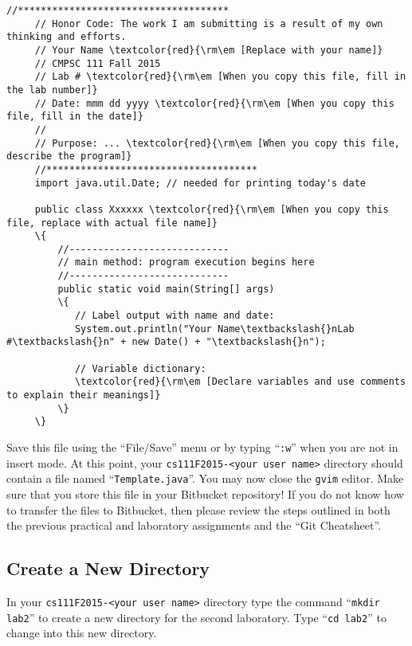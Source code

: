 \newpage
\begin{Verbatim}[commandchars=\\\{\}]
     //*************************************
     // Honor Code: The work I am submitting is a result of my own thinking and efforts.
     // Your Name \textcolor{red}{\rm\em [Replace with your name]}
     // CMPSC 111 Fall 2015
     // Lab # \textcolor{red}{\rm\em [When you copy this file, fill in the lab number]}
     // Date: mmm dd yyyy \textcolor{red}{\rm\em [When you copy this file, fill in the date]}
     //
     // Purpose: ... \textcolor{red}{\rm\em [When you copy this file, describe the program]}
     //*************************************
     import java.util.Date; // needed for printing today's date

     public class Xxxxxx \textcolor{red}{\rm\em [When you copy this file, replace with actual file name]}
     \{
         //----------------------------
         // main method: program execution begins here
         //----------------------------
         public static void main(String[] args)
         \{
            // Label output with name and date:
            System.out.println("Your Name\textbackslash{}nLab #\textbackslash{}n" + new Date() + "\textbackslash{}n");

            // Variable dictionary:
            \textcolor{red}{\rm\em [Declare variables and use comments to explain their meanings]}
         \}
     \}
\end{Verbatim}

\vspace*{-.1in}

\noindent Save this file using the ``File/Save'' menu or by typing ``{\tt :w}'' when you are not in insert mode. At this
point, your {\tt cs111F2015-<your user name>} directory should contain a file named ``{\tt Template.java}''. You may now
close the {\tt gvim} editor. Make sure that you store this file in your Bitbucket repository! If you do not know how to
transfer the files to Bitbucket, then please review the steps outlined in both the previous practical and laboratory
assignments and the ``Git Cheatsheet''.

\vspace*{-.1in}
\subsection*{Create a New Directory}

In your {\tt cs111F2015-<your user name>} directory type the command ``{\tt mkdir lab2}'' to create a new directory for
the second laboratory.
\noindent Type ``{\tt cd lab2}'' to change into this new directory.


